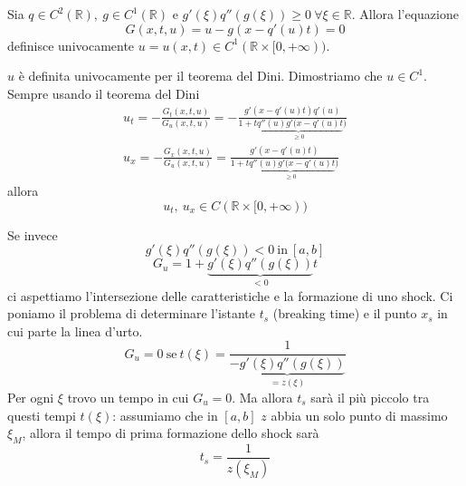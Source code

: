 \documentclass[10pt,a4paper,twoside,openright]{book}
\begin{document}
\begin{theorem}
	Sia $\displaystyle q\in C^{2}(\mathbb{R}) ,\ g\in C^{1}(\mathbb{R})$ e $\displaystyle g'( \xi ) q''( g( \xi )) \geqslant 0\ \forall \xi \in \mathbb{R}$. Allora l'equazione
	\begin{equation*}
		G( x,t,u) =u-g( x-q'( u) t) =0
	\end{equation*}
	definisce univocamente $\displaystyle u=u( x,t) \in C^{1}(\mathbb{R} \times [ 0,+\infty ))$.
\end{theorem}
\begin{dimostrazione}
	$\displaystyle u$ è definita univocamente per il teorema del Dini. Dimostriamo che $\displaystyle u\in C^{1}$. Sempre usando il teorema del Dini
	\begin{gather*}
		u_{t} =-\frac{G_{t}( x,t,u)}{G_{u}( x,t,u)} =-\frac{g'( x-q'( u) t) q'( u)}{1+\underbrace{tq''( u) g'( x-q'( u) t}_{\geqslant 0})}\\
		u_{x} =-\frac{G_{x}( x,t,u)}{G_{u}( x,t,u)} =\frac{g'( x-q'( u) t)}{1+\underbrace{tq''( u) g'( x-q'( u) t}_{\geqslant 0})}
	\end{gather*}
	allora
	\begin{equation*}
		u_{t} ,\ u_{x} \in C(\mathbb{R} \times [ 0,+\infty ))
	\end{equation*}
\end{dimostrazione}
Se invece
\begin{equation*}
	g'( \xi ) q''( g( \xi )) < 0\ \text{in} \ [ a,b]
\end{equation*}
\begin{equation*}
	G_{u} =1+\underbrace{g'( \xi ) q''( g( \xi ))}_{< 0} t
\end{equation*}
ci aspettiamo l'intersezione delle caratteristiche e la formazione di uno shock. Ci poniamo il problema di determinare l'istante $\displaystyle t_{s}$ (breaking time) e il punto $\displaystyle x_{s}$ in cui parte la linea d'urto.
\begin{equation*}
	G_{u} =0\ \text{se} \ t( \xi ) =\frac{1}{\underbrace{-g'( \xi ) q''( g( \xi ))}_{=z( \xi )}}
\end{equation*}
Per ogni $\displaystyle \xi $ trovo un tempo in cui $\displaystyle G_{u} =0$. Ma allora $\displaystyle t_{s}$ sarà il più piccolo tra questi tempi $\displaystyle t( \xi )$: assumiamo che in $\displaystyle [ a,b]$ $\displaystyle z$ abbia un solo punto di massimo $\displaystyle \xi _{M}$, allora il tempo di prima formazione dello shock sarà
\begin{equation*}
	t_{s} =\frac{1}{z( \xi _{M})}
\end{equation*}
\end{document}
